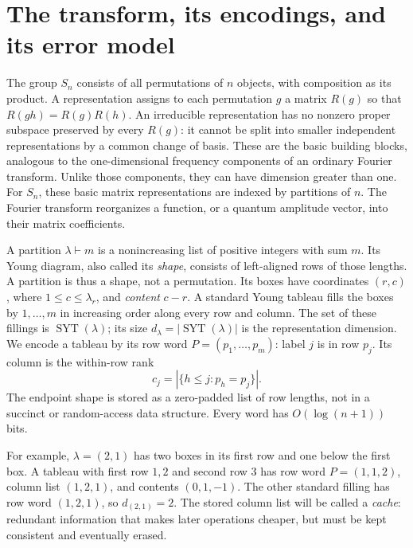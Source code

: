 \documentclass[11pt]{article}
\theoremstyle{definition}
\newcommand{\SYT}{\operatorname{SYT}}
\begin{document}
\section{The transform, its encodings, and its error model}\label{sec:conventions}

The group $S_n$ consists of all permutations of $n$ objects, with
composition as its product. A representation assigns to each permutation
$g$ a matrix $R(g)$ so that $R(gh)=R(g)R(h)$. An irreducible representation
has no nonzero proper subspace preserved by every $R(g)$: it cannot be
split into smaller independent representations by a common change of
basis. These are the basic building blocks, analogous to the
one-dimensional frequency components of an ordinary Fourier transform.
Unlike those components, they can have dimension greater than one.
For $S_n$, these basic matrix
representations are indexed by partitions of $n$. The Fourier transform
reorganizes a function, or a quantum amplitude vector, into their matrix
coefficients.

A partition $\lambda\vdash m$ is a nonincreasing list of positive integers
with sum $m$. Its Young diagram, also called its \emph{shape}, consists
of left-aligned rows of those lengths. A partition is thus a shape, not
a permutation. Its boxes have coordinates $(r,c)$, where
$1\le c\le\lambda_r$, and \emph{content} $c-r$.
A standard Young tableau fills the boxes by $1,\ldots,m$
in increasing order along every row and column.
The set of these fillings is $\SYT(\lambda)$; its size
$d_\lambda=|\SYT(\lambda)|$ is the representation dimension.
We encode a tableau by its row word $P=(p_1,\ldots,p_m)$: label $j$ is in
row $p_j$. Its column is the within-row rank
\[
 c_j=|\{h\le j:p_h=p_j\}|.
\]
The endpoint shape is stored as a zero-padded list of row lengths, not in a
succinct or random-access data structure. Every word has $O(\log(n+1))$ bits.

For example, $\lambda=(2,1)$ has two boxes in its first row and one below
the first box. A tableau with first row $1,2$ and second row $3$ has
row word $P=(1,1,2)$, column list $(1,2,1)$, and contents $(0,1,-1)$.
The other standard filling has row word $(1,2,1)$, so $d_{(2,1)}=2$.
The stored column list will be called a \emph{cache}: redundant information
that makes later operations cheaper, but must be kept consistent and
eventually erased.
\end{document}
